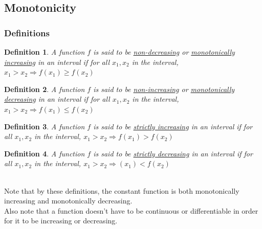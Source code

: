 \documentclass[14]{article}
\newtheorem{define}{Definition}
\theoremstyle{definition}
\theoremstyle{case}
\begin{document}
\subsection{Monotonicity}
\subsubsection{Definitions}
\begin{define}
A function $f$ is said to be \underline{non-decreasing} or \underline{monotonically increasing} in an interval if for all $x_1, x_2$ in the interval, $x_1 > x_2 \Rightarrow f(x_1) \geq f(x_2)$
\end{define}
\begin{define}
A function $f$ is said to be \underline{non-increasing} or \underline{monotonically decreasing} in an interval if for all $x_1, x_2$ in the interval, $x_1 > x_2 \Rightarrow f(x_1) \leq f(x_2)$
\end{define}
\begin{define}
A function $f$ is said to be \underline{strictly increasing} in an interval if for all $x_1, x_2$ in the interval, $x_1 > x_2 \Rightarrow f(x_1) > f(x_2)$
\end{define}
\begin{define}
A function $f$ is said to be \underline{strictly decreasing} in an interval if for all $x_1, x_2$ in the interval, $x_1 > x_2 \Rightarrow (x_1) < f(x_2)$
\end{define}\;\\
Note that by these definitions, the constant function is both monotonically increasing and monotonically decreasing.\\
Also note that a function doesn't have to be continuous or differentiable in order for it to be increasing or decreasing.
\end{document}
